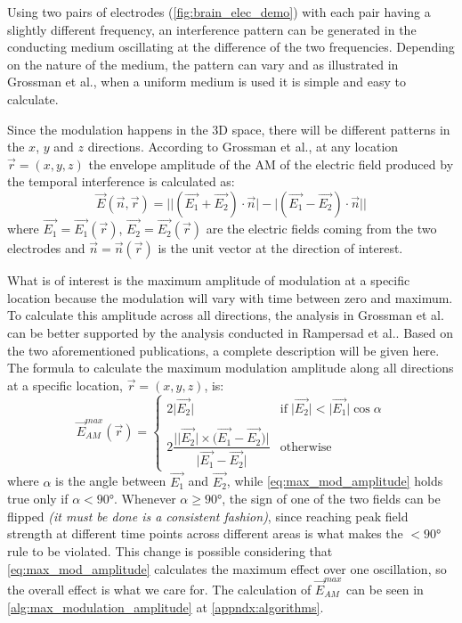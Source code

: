 Using two pairs of electrodes (\autoref{fig:brain_elec_demo}) with each pair having a slightly different frequency, an interference pattern can be generated in the conducting medium oscillating at the difference of the two frequencies. Depending on the nature of the medium, the pattern can vary and as illustrated in Grossman et al.\cite{Grossman2017}, when a uniform medium is used it is simple and easy to calculate.

Since the modulation happens in the 3D space, there will be different patterns in the $x$, $y$ and $z$ directions. According to Grossman et al.\cite[page 20]{Grossman2017}, at any location $\vec{r} = (x,y,z)$ the envelope amplitude of the \gls{AM} of the electric field produced by the temporal interference is calculated as:
\begin{equation}
    \label{eq:directional_amplitude}
    \vec{E}(\vec{n},\vec{r}) = \Big|\big|(\vec{E_1} + \vec{E_2})\cdot\vec{n}\big| - \big|(\vec{E_1} - \vec{E_2})\cdot\vec{n}\big|\Big|
\end{equation}
where $\vec{E_1} = \vec{E_1}(\vec{r})$, $\vec{E_2} = \vec{E_2}(\vec{r})$ are the electric fields coming from the two electrodes and $\vec{n} = \vec{n}(\vec{r})$ is the unit vector at the direction of interest.
\\\vspace{1pt}

What is of interest is the maximum amplitude of modulation at a specific location because the modulation will vary with time between zero and maximum. To calculate this amplitude across all directions, the analysis in Grossman et al.\cite[page 20]{Grossman2017} can be better supported by the analysis conducted in Rampersad et al.\cite[section 2.5]{Rampersad2019}. Based on the two aforementioned publications, a complete description will be given here. The formula to calculate the maximum modulation amplitude along all directions at a specific location, $\vec{r} = (x,y,z)$, is:
\begin{equation}
    \label{eq:max_mod_amplitude}
    \vec{E}_{AM}^{max}(\vec{r}) = \begin{cases}
        2\big|\vec{E_2}\big| & \text{if}\; \big|\vec{E_2}\big| < \big|\vec{E_1}\big|\cos\alpha \\
        &\\
      2\dfrac{\Big|\big|\vec{E_2}\big|\times\big(\vec{E_1} - \vec{E_2}\big)\Big|}{\big|\vec{E_1} - \vec{E_2}\big|} & \text{otherwise}
    \end{cases}
\end{equation}
where $\alpha$ is the angle between $\vec{E_1}$ and $\vec{E_2}$, while \autoref{eq:max_mod_amplitude} holds true only if $\alpha < 90\si{\degree}$. Whenever $\alpha \geq 90\si{\degree}$, the sign of one of the two fields can be flipped \textit{(it must be done is a consistent fashion)}, since reaching peak field strength at different time points across different areas is what makes the $< 90\si{\degree}$ rule to be violated. This change is possible considering that \autoref{eq:max_mod_amplitude} calculates the maximum effect over one oscillation, so the overall effect is what we care for. The calculation of $\vec{E}_{AM}^{max}$ can be seen in \autoref{alg:max_modulation_amplitude} at \autoref{appndx:algorithms}.
